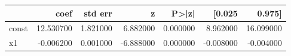\begin{tabular}{lrrrrrr}
\toprule
 & coef & std err & z & P>|z| & [0.025 & 0.975] \\
\midrule
const & 12.530700 & 1.821000 & 6.882000 & 0.000000 & 8.962000 & 16.099000 \\
x1 & -0.006200 & 0.001000 & -6.888000 & 0.000000 & -0.008000 & -0.004000 \\
\bottomrule
\end{tabular}
